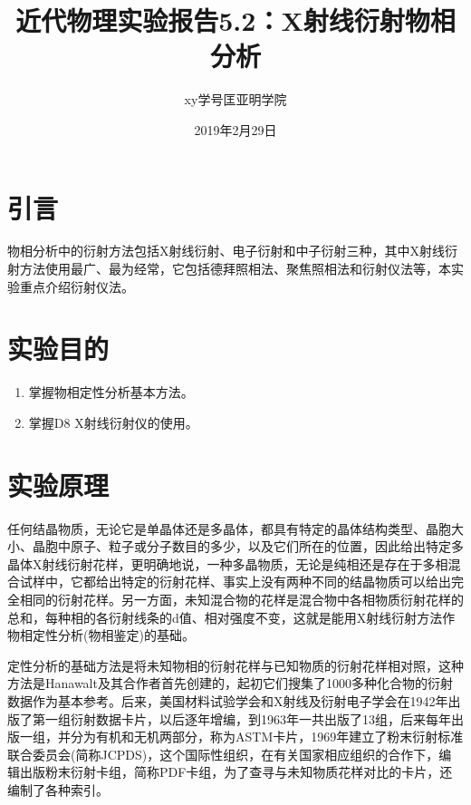 \documentclass[a4paper]{article}
\title{近代物理实验报告5.2：X射线衍射物相分析}
\author{xy\quad 学号\quad 匡亚明学院}
\date{2019年2月29日}
\begin{document}
\maketitle


\section{引言}
物相分析中的衍射方法包括X射线衍射、电子衍射和中子衍射三种，其中X射线衍射方法使用最广、最为经常，它包括德拜照相法、聚焦照相法和衍射仪法等，本实验重点介绍衍射仪法。

\section{实验目的}
\begin{enumerate}
\item 掌握物相定性分析基本方法。
\item 掌握D8 X射线衍射仪的使用。
\end{enumerate}


\section{实验原理}
任何结晶物质，无论它是单晶体还是多晶体，都具有特定的晶体结构类型、晶胞大小、晶胞中原子、粒子或分子数目的多少，以及它们所在的位置，因此给出特定多晶体X射线衍射花样，更明确地说，一种多晶物质，无论是纯相还是存在于多相混合试样中，它都给出特定的衍射花样、事实上没有两种不同的结晶物质可以给出完全相同的衍射花样。另一方面，未知混合物的花样是混合物中各相物质衍射花样的总和，每种相的各衍射线条的d值、相对强度不变，这就是能用X射线衍射方法作物相定性分析(物相鉴定)的基础。

定性分析的基础方法是将未知物相的衍射花样与已知物质的衍射花样相对照，这种方法是Hanawalt及其合作者首先创建的，起初它们搜集了1000多种化合物的衍射数据作为基本参考。后来，美国材料试验学会和X射线及衍射电子学会在1942年出版了第一组衍射数据卡片，以后逐年增编，到1963年一共出版了13组，后来每年出版一组，并分为有机和无机两部分，称为ASTM卡片，1969年建立了粉末衍射标准联合委员会(简称JCPDS)，这个国际性组织，在有关国家相应组织的合作下，编辑出版粉末衍射卡组，简称PDF卡组，为了查寻与未知物质花样对比的卡片，还编制了各种索引。
\end{document}
